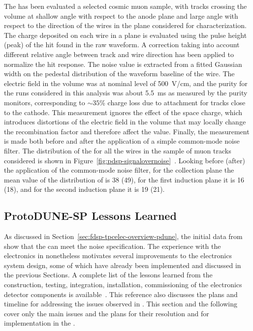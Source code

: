 The  has been evaluated a selected cosmic muon sample, with tracks
crossing the  volume at shallow angle with respect to the anode plane and
large angle with respect to the direction of the wires in the plane considered
for  characterization. The charge deposited on each wire in a plane is evaluated
using the pulse height (peak) of the hit found in the raw waveform.
A correction taking into account different relative angle between track and wire
direction has been applied to normalize the hit response. The noise value is extracted
from a fitted Gaussian width on the pedestal distribution of the waveform baseline of the
wire. The electric field in the  volume was at nominal level of \SI{500}{V/cm},
and the  purity for the runs considered in this analysis was about \SI{5.5}{ms}
as measured by the purity monitors, corresponding to $\sim35$\% charge loss due to
attachment for tracks close to the cathode. This measurement ignores the effect of the
space charge, which introduces distortions of the electric field in the  volume that
may locally change the recombination factor and therefore affect the  value. Finally,
the measurement is made both before and after the application of a simple common-mode noise filter.
The distribution of the  for all the wires in the sample of muon tracks considered is
shown in Figure~\ref{fig:pdsp-signalovernoise}~\cite{pend_PDSP_PerfPaper}. Looking before (after)
the application of the common-mode noise filter, for the collection plane the mean value of the
distribution of  is 38 (49), for the first induction plane it is 16 (18), and for the
second induction plane it is 19 (21).

\subsection{ProtoDUNE-SP Lessons Learned}
\label{sec:fdsp-tpcelec-overview-lessons}

As discussed in Section~\ref{sec:fdsp-tpcelec-overview-pdune}, the initial 
data from  show that the  can meet the noise specification. 
The experience with the  electronics in  nonetheless motivates 
several improvements to the  electronics system design, some of which
have already been implemented and discussed in the previous Sections.
A complete list of the lessons learned from the construction, testing, integration,
installation, commissioning of the  electronics detector components
is available~\cite{bib:docdb12367}. This reference also discusses
the plans and timeline for addressing the issues observed in . 
This  section and the following cover only the main issues 
and the plans for their resolution and for implementation in the . 

